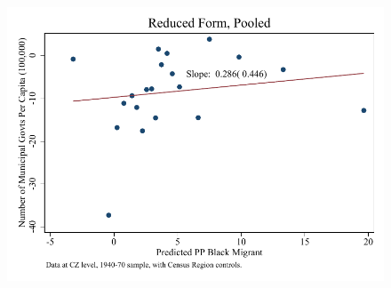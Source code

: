 \documentclass{article}
\begin{document}
\begin{figure}
\centering
\includegraphics{figures/simplefigs/pooled_gen_muni_pc_C3_rf.pdf}
\end{figure}
\clearpage
\end{document}
